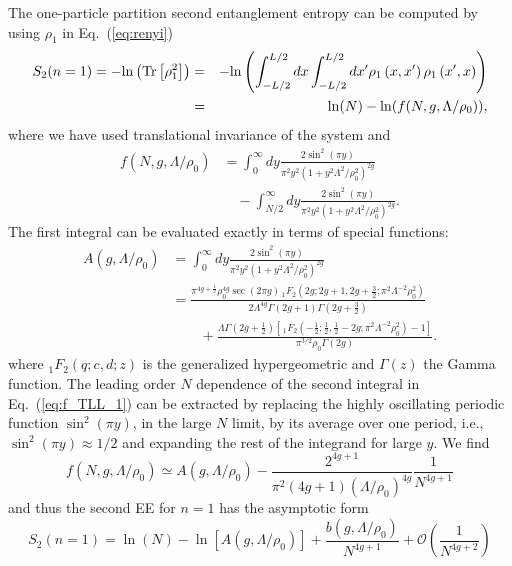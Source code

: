 The one-particle partition second \ren entanglement entropy can be computed by using
$\rho_1$ in Eq.~(\ref{eq:renyi}) 
%
\begin{eqnarray}
S_2(n = 1)=-{\rm{ln}}\left({\rm{Tr}}\left[{\rho}^2_1\right]\right)&=&
    -{\rm{ln}}\left(\int_{-L/2}^{L/2} dx \int_{-L/2}^{L/2}dx'
    \rho_1\left(x,x'\right)\rho_1\left(x',x\right)\right)\nonumber\\ &=&
    {\rm{ln}}(N)-{\rm{ln}}(f(N,g,\Lambda/\rho_0)),\label{eq:S2_TLL}
\end{eqnarray}
%
where we have used translational invariance of the system and 
%
\begin{align}
    f(N,g,\Lambda/\rho_0) & =\int_{0}^{\infty} dy\frac{2\sin^2(\pi
y)}{\pi^2y^2(1+y^2\Lambda^2/\rho_0^2)^{2g}} \nonumber \\
& \quad -\int_{N/2}^{\infty} dy\frac{2\sin^2(\pi y)}{\pi^2y^2(1+y^2\Lambda^2/\rho_0^2)^{2g}}. 
\label{eq:f_TLL_1}
\end{align}
% 
The first integral can be evaluated exactly in terms of special functions:
%
\begin{align}
A (g,\Lambda/\rho_0) &= \int_{0}^{\infty} dy\frac{2\sin^2(\pi
y)}{\pi^2y^2(1+y^2\Lambda^2/\rho_0^2)^{2g}} \nonumber \\
&= \frac{ \pi ^{4 g+\frac{1}{2}} \rho_0 ^{4g} \sec (2 \pi
g) \, _1F_2\left(2 g;2 g+1,2 g+\frac{3}{2};\pi ^2 \Lambda ^{-2}\rho_0
^2\right)}{2 \Lambda ^{4 g} \Gamma (2 g+1) \Gamma (2 g+\frac{3}{2})}\nonumber\\
&\quad\quad + \frac{ \Lambda\Gamma \left(2 g+\frac{1}{2}\right) \left[\,
_1F_2\left(-\frac{1}{2};\frac{1}{2},\frac{1}{2}-2 g;\pi ^2 \Lambda ^{-2} \rho_0
^2\right)-1\right]}{\pi ^{3/2} \rho_0 \Gamma (2 g)}.
\label{eq:A_TLL}
\end{align}
% 
where $_1F_2(q;c,d;z)$ is the generalized hypergeometric and $\Gamma(z)$ the
Gamma function.  The leading order $N$ dependence of the
second integral in Eq.~(\ref{eq:f_TLL_1}) can be extracted by replacing the
highly oscillating periodic function $\sin^2(\pi y)$, in the large $N$ limit,
by its average over one period, i.e., $\sin^2(\pi y) \approx 1/2$ and
expanding the rest of the integrand for large $y$. We find
%
\begin{equation}
f(N,g,\Lambda/\rho_0) \simeq  A(g,\Lambda/\rho_0)-\frac{2^{4 g+1}}{\pi ^2 (4
g+1)(\Lambda/\rho_0)^{4g}} \frac{1}{N^{4g+1}} 
\label{eq:f_infty}
\end{equation}
%
and thus the second \ren EE for $n=1$ has the asymptotic form
%
\begin{equation}
S_2(n=1) =  \ln(N)-\ln\left[A(g,\Lambda/\rho_0)\right] +
\frac{b(g,\Lambda/\rho_0)}{N^{4g+1}}
+\mathcal{O}\left(\frac{1}{N^{4g+2}}\right)
\label{eq:s2n1_asymptotic}
\end{equation}
